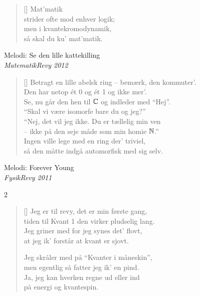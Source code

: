 {\begin{multicols}
\begin{verse}[\versewidth]
Mat'matik\\
strider ofte mod enhver logik;\\
men i kvantekromodynamik,\\
så skal du ku' mat'matik.
\end{verse}
\end{multicols}



\newpage


\label{EnRingeHistorie}
{Melodi: Se den lille kattekilling}\\[.2em]
{\small\itshape MatematikRevy 2012}

\settowidth{\versewidth}{Betragt en lille abelsk ring bemærk den kommuter'}
\begin{verse}[\versewidth]
Betragt en lille abelsk ring -- bemærk, den kommuter'.\\
Den har netop ét 0 og ét 1 og ikke mer'.\\
Se, nu går den hen til $\mathbb C$ og indleder med ``Hej''.\\
``Skal vi være isomorfe bare du og jeg?''\\
``Nej, det vil jeg ikke. Du er tællelig min ven\\
-- ikke på den seje måde som min homie $\mathbb N$.''\\
Ingen ville lege med en ring der' triviel,\\
så den måtte indgå automorfisk med sig selv.
\end{verse}


{Melodi: Forever Young}\\[.2em]
{\small\itshape FysikRevy 2011}

\begin{multicols}2
\settowidth{\versewidth}{Hvor'n er det at kvante i måneskin?}
\begin{verse}[\versewidth]
Jeg er til revy, det er min første gang,\\
tiden til Kvant 1 den virker pludselig lang.\\
Jeg griner med for jeg synes det' flovt,\\
at jeg ik' forstår at kvant er sjovt.

Jeg skråler med på ``Kvanter i måneskin'',\\
men egentlig så fatter jeg ik' en pind.\\
Ja, jeg kan hverken regne ud eller ind\\
på energi og kvantespin.


\end{verse}
\end{multicols}}
